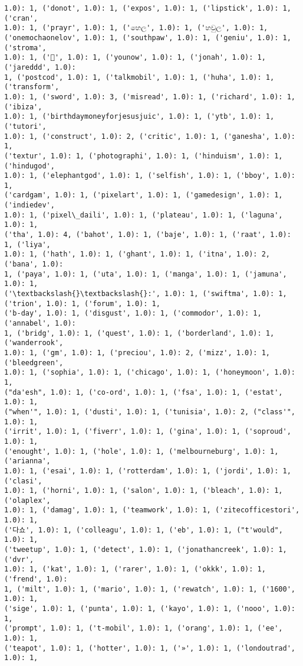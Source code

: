 \documentclass[11pt]{article}
\begin{document}
\begin{Verbatim}[commandchars=\\\{\}]
1.0): 1, ('donot', 1.0): 1, ('expos', 1.0): 1, ('lipstick', 1.0): 1, ('cran',
1.0): 1, ('prayr', 1.0): 1, ('හෙල', 1.0): 1, ('හවුල', 1.0): 1,
('onemochaonelov', 1.0): 1, ('southpaw', 1.0): 1, ('geniu', 1.0): 1, ('stroma',
1.0): 1, ('🔴', 1.0): 1, ('younow', 1.0): 1, ('jonah', 1.0): 1, ('jareddd', 1.0):
1, ('postcod', 1.0): 1, ('talkmobil', 1.0): 1, ('huha', 1.0): 1, ('transform',
1.0): 1, ('sword', 1.0): 3, ('misread', 1.0): 1, ('richard', 1.0): 1, ('ibiza',
1.0): 1, ('birthdaymoneyforjesusjuic', 1.0): 1, ('ytb', 1.0): 1, ('tutori',
1.0): 1, ('construct', 1.0): 2, ('critic', 1.0): 1, ('ganesha', 1.0): 1,
('textur', 1.0): 1, ('photographi', 1.0): 1, ('hinduism', 1.0): 1, ('hindugod',
1.0): 1, ('elephantgod', 1.0): 1, ('selfish', 1.0): 1, ('bboy', 1.0): 1,
('cardgam', 1.0): 1, ('pixelart', 1.0): 1, ('gamedesign', 1.0): 1, ('indiedev',
1.0): 1, ('pixel\_daili', 1.0): 1, ('plateau', 1.0): 1, ('laguna', 1.0): 1,
('tha', 1.0): 4, ('bahot', 1.0): 1, ('baje', 1.0): 1, ('raat', 1.0): 1, ('liya',
1.0): 1, ('hath', 1.0): 1, ('ghant', 1.0): 1, ('itna', 1.0): 2, ('bana', 1.0):
1, ('paya', 1.0): 1, ('uta', 1.0): 1, ('manga', 1.0): 1, ('jamuna', 1.0): 1,
('\textbackslash{}\textbackslash{}:', 1.0): 1, ('swiftma', 1.0): 1, ('trion', 1.0): 1, ('forum', 1.0): 1,
('b-day', 1.0): 1, ('disgust', 1.0): 1, ('commodor', 1.0): 1, ('annabel', 1.0):
1, ('bridg', 1.0): 1, ('quest', 1.0): 1, ('borderland', 1.0): 1, ('wanderrook',
1.0): 1, ('gm', 1.0): 1, ('preciou', 1.0): 2, ('mizz', 1.0): 1, ('bleedgreen',
1.0): 1, ('sophia', 1.0): 1, ('chicago', 1.0): 1, ('honeymoon', 1.0): 1,
("da'esh", 1.0): 1, ('co-ord', 1.0): 1, ('fsa', 1.0): 1, ('estat', 1.0): 1,
("when'", 1.0): 1, ('dusti', 1.0): 1, ('tunisia', 1.0): 2, ("class'", 1.0): 1,
('irrit', 1.0): 1, ('fiverr', 1.0): 1, ('gina', 1.0): 1, ('soproud', 1.0): 1,
('enought', 1.0): 1, ('hole', 1.0): 1, ('melbourneburg', 1.0): 1, ('arianna',
1.0): 1, ('esai', 1.0): 1, ('rotterdam', 1.0): 1, ('jordi', 1.0): 1, ('clasi',
1.0): 1, ('horni', 1.0): 1, ('salon', 1.0): 1, ('bleach', 1.0): 1, ('olaplex',
1.0): 1, ('damag', 1.0): 1, ('teamwork', 1.0): 1, ('zitecofficestori', 1.0): 1,
('다쇼', 1.0): 1, ('colleagu', 1.0): 1, ('eb', 1.0): 1, ("t'would", 1.0): 1,
('tweetup', 1.0): 1, ('detect', 1.0): 1, ('jonathancreek', 1.0): 1, ('dvr',
1.0): 1, ('kat', 1.0): 1, ('rarer', 1.0): 1, ('okkk', 1.0): 1, ('frend', 1.0):
1, ('milt', 1.0): 1, ('mario', 1.0): 1, ('rewatch', 1.0): 1, ('1600', 1.0): 1,
('sige', 1.0): 1, ('punta', 1.0): 1, ('kayo', 1.0): 1, ('nooo', 1.0): 1,
('prompt', 1.0): 1, ('t-mobil', 1.0): 1, ('orang', 1.0): 1, ('ee', 1.0): 1,
('teapot', 1.0): 1, ('hotter', 1.0): 1, ('»', 1.0): 1, ('londoutrad', 1.0): 1,

\end{Verbatim}
\end{document}
